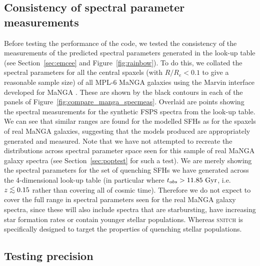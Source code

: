 \documentclass[useAMS,usenatbib]{mn2e}
\def\lesssim{\mathrel{\hbox{\rlap{\hbox{\lower3pt\hbox{$\sim$}}}\hbox{\raise2pt\hbox{$<$}}}}}
\begin{document}
\subsection{Consistency of spectral parameter measurements}\label{sec:precisiontest}


Before testing the performance of the code, we tested the consistency of the measurements of the predicted spectral parameters generated in the look-up table (see Section~\ref{sec:emcee} and Figure~\ref{fig:rainbow}). To do this, we collated the spectral parameters for all the central spaxels (with $R/R_e < 0.1$ to give a reasonable sample size) of all MPL-6 MaNGA galaxies using the Marvin interface developed for MaNGA \citep{cherinka18}. These are shown by the black contours in each of the panels of Figure~\ref{fig:compare_manga_specmeas}. Overlaid are points showing the spectral measurements for the synthetic FSPS spectra from the look-up table. We can see that similar ranges are found for the modelled SFHs as for the spaxels of real MaNGA galaxies, suggesting that the models produced are appropriately generated and measured. Note that we have not attempted to recreate the distributions across spectral parameter space seen for this sample of real MaNGA galaxy spectra (see Section~\ref{sec:poptest} for such a test). We are merely showing the spectral parameters for the set of quenching SFHs we have generated across the 4-dimensional look-up table (in particular where $t_{obs} > 11.85~\rm{Gyr}$, i.e. $z \lesssim 0.15$ rather than covering all of cosmic time). Therefore we do not expect to cover the full range in spectral parameters seen for the real MaNGA galaxy spectra, since these will also include spectra that are starbursting, have increasing star formation rates or contain younger stellar populations. Whereas \textsc{snitch} is specifically designed to target the properties of quenching stellar populations. 


\subsection{Testing precision}\label{sec:precisiontest}

\end{document}
